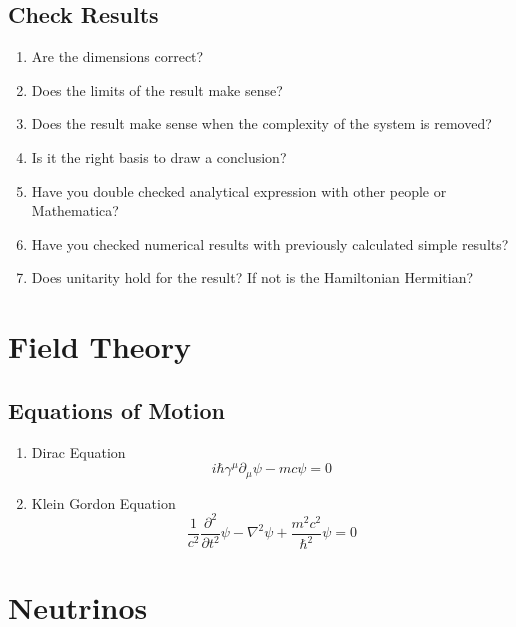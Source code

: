 \documentclass{sciposter}
\begin{document}
\begin{multicols}{3}
\subsection{Check Results}

\begin{enumerate}
    \item Are the dimensions correct?
    \item Does the limits of the result make sense?
    \item Does the result make sense when the complexity of the system is removed?
    \item Is it the right basis to draw a conclusion?
    \item Have you double checked analytical expression with other people or Mathematica?
    \item Have you checked numerical results with previously calculated simple results?
    \item Does unitarity hold for the result? If not is the Hamiltonian Hermitian?
\end{enumerate}








\section{Field Theory}


\subsection{Equations of Motion}

\begin{enumerate}
\item Dirac Equation
\begin{equation}
i\hbar \gamma^\mu \partial_\mu \psi - m c \psi = 0
\end{equation}
\item Klein Gordon Equation
\begin{equation}
\frac {1}{c^2} \frac{\partial^2}{\partial t^2} \psi - \nabla^2 \psi + \frac {m^2 c^2}{\hbar^2} \psi = 0
\end{equation}
\end{enumerate}






\section{Neutrinos}



\end{multicols}
\end{document}
